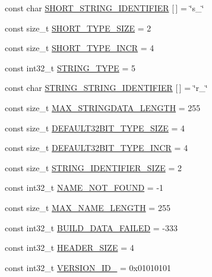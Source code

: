 \begin{DoxyCompactItemize}
const char \mbox{\hyperlink{a00851_a5d6864069bd1e6c2850bee584b6246c8}{S\+H\+O\+R\+T\+\_\+\+S\+T\+R\+I\+N\+G\+\_\+\+I\+D\+E\+N\+T\+I\+F\+I\+ER}} \mbox{[}$\,$\mbox{]} = \char`\"{}s\+\_\+\char`\"{}
\item 
const size\+\_\+t \mbox{\hyperlink{a00851_a6807b39d59eed044eeefbd82c1fc9197}{S\+H\+O\+R\+T\+\_\+\+T\+Y\+P\+E\+\_\+\+S\+I\+ZE}} = 2
\item 
const size\+\_\+t \mbox{\hyperlink{a00851_a9aefe47f82372a9983eb5c00c14ac766}{S\+H\+O\+R\+T\+\_\+\+T\+Y\+P\+E\+\_\+\+I\+N\+CR}} = 4
\item 
const int32\+\_\+t \mbox{\hyperlink{a00851_aa7125477a4c5349f73b433334e9c4254}{S\+T\+R\+I\+N\+G\+\_\+\+T\+Y\+PE}} = 5
\item 
const char \mbox{\hyperlink{a00851_a3004646ddde8fc7d2ddf5402f50734f4}{S\+T\+R\+I\+N\+G\+\_\+\+S\+T\+R\+I\+N\+G\+\_\+\+I\+D\+E\+N\+T\+I\+F\+I\+ER}} \mbox{[}$\,$\mbox{]} = \char`\"{}r\+\_\+\char`\"{}
\item 
const size\+\_\+t \mbox{\hyperlink{a00851_a7c0e3fa427134810f5f7e12ae51c0e4e}{M\+A\+X\+\_\+\+S\+T\+R\+I\+N\+G\+D\+A\+T\+A\+\_\+\+L\+E\+N\+G\+TH}} = 255
\item 
const size\+\_\+t \mbox{\hyperlink{a00851_af40b7896c48bd8bb3ac060601e5e6945}{D\+E\+F\+A\+U\+L\+T32\+B\+I\+T\+\_\+\+T\+Y\+P\+E\+\_\+\+S\+I\+ZE}} = 4
\item 
const size\+\_\+t \mbox{\hyperlink{a00851_a6d7547242543558d67e96139a5627dd2}{D\+E\+F\+A\+U\+L\+T32\+B\+I\+T\+\_\+\+T\+Y\+P\+E\+\_\+\+I\+N\+CR}} = 4
\item 
const size\+\_\+t \mbox{\hyperlink{a00851_a11fc46547f00cbbe29b02b1ebd0f3dd0}{S\+T\+R\+I\+N\+G\+\_\+\+I\+D\+E\+N\+T\+I\+F\+I\+E\+R\+\_\+\+S\+I\+ZE}} = 2
\item 
const int32\+\_\+t \mbox{\hyperlink{a00851_a4af33563bfa9a20e489750090bb68329}{N\+A\+M\+E\+\_\+\+N\+O\+T\+\_\+\+F\+O\+U\+ND}} = -\/1
\item 
const size\+\_\+t \mbox{\hyperlink{a00851_a8cd7e74db8ce7ce5c4efdb9c5388742a}{M\+A\+X\+\_\+\+N\+A\+M\+E\+\_\+\+L\+E\+N\+G\+TH}} = 255
\item 
const int32\+\_\+t \mbox{\hyperlink{a00851_ab6190197be23431113a1f2b3f445ac9d}{B\+U\+I\+L\+D\+\_\+\+D\+A\+T\+A\+\_\+\+F\+A\+I\+L\+ED}} = -\/333
\item 
const int32\+\_\+t \mbox{\hyperlink{a00851_a4781240b7c5d7e82d07278fd9e6f7524}{H\+E\+A\+D\+E\+R\+\_\+\+S\+I\+ZE}} = 4
\item 
const int32\+\_\+t \mbox{\hyperlink{a00851_ae795429da33216b570397920343b8f05}{V\+E\+R\+S\+I\+O\+N\+\_\+\+I\+D\+\_}} = 0x01010101
\end{DoxyCompactItemize}


